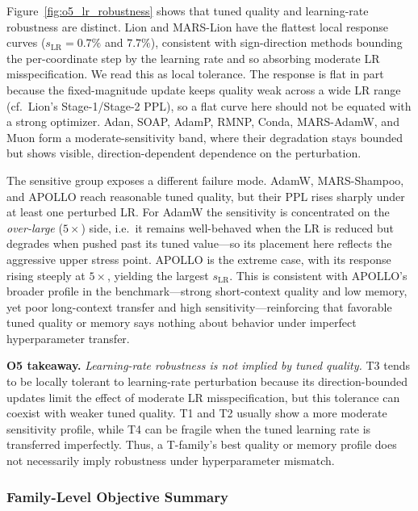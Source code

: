 Figure~\ref{fig:o5_lr_robustness} shows that tuned quality and learning-rate
robustness are distinct. Lion and MARS-Lion have the flattest local response
curves ($s_{\mathrm{LR}}=0.7\%$ and $7.7\%$), consistent with sign-direction
methods bounding the per-coordinate step by the learning rate and so absorbing
moderate LR misspecification. We read this as local tolerance. The response is flat in part because the fixed-magnitude update keeps
quality weak across a wide LR range (cf.\ Lion's Stage-1/Stage-2 PPL), so a flat
curve here should not be equated with a strong optimizer. Adan, SOAP, AdamP,
RMNP, Conda, MARS-AdamW, and Muon form a moderate-sensitivity band, where their
degradation stays bounded but shows visible, direction-dependent dependence on
the perturbation.

The sensitive group exposes a different failure mode. AdamW, MARS-Shampoo, and
APOLLO reach reasonable tuned quality, but their PPL rises sharply under at
least one perturbed LR. For AdamW the sensitivity is concentrated on the
\emph{over-large} ($5\times$) side, i.e.\ it
remains well-behaved when the LR is reduced but degrades when pushed past its
tuned value---so its placement here reflects the aggressive upper stress point.
APOLLO is the extreme case, with its
response rising steeply at $5\times$, yielding the largest $s_{\mathrm{LR}}$.
This is consistent with APOLLO's broader profile in the benchmark---strong
short-context quality and low memory, yet poor long-context transfer and high
sensitivity---reinforcing that favorable tuned quality or memory says nothing
about behavior under imperfect hyperparameter transfer.

\begin{takeaway}
\noindent\textbf{O5 takeaway.}
\emph{Learning-rate robustness is not implied by tuned quality.} T3 tends to
be locally tolerant to learning-rate perturbation because its direction-bounded
updates limit the effect of moderate LR misspecification, but this tolerance
can coexist with weaker tuned quality. T1 and T2 usually show a more moderate
sensitivity profile, while T4 can be fragile when the tuned learning rate is
transferred imperfectly. Thus, a T-family's best quality or memory profile
does not necessarily imply robustness under hyperparameter mismatch.
\end{takeaway}



\subsubsection{Family-Level Objective Summary}
\label{sec:benchmark-family-summary}

